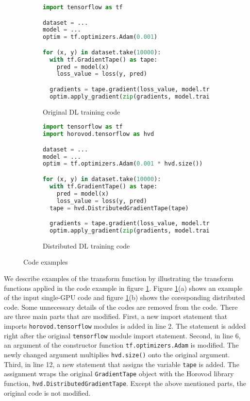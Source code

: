 \begin{figure}[ht!]
  \centering
  \begin{subfigure}[t]{0.48\textwidth}
    \begin{lstlisting}[language=Python]
import tensorflow as tf

dataset = ...
model = ...
optim = tf.optimizers.Adam(0.001) 

for (x, y) in dataset.take(10000):
  with tf.GradientTape() as tape:
    pred = model(x)
    loss_value = loss(y, pred) 

  gradients = tape.gradient(loss_value, model.trainable_variables)
  optim.apply_gradient(zip(gradients, model.trainable_variable)\end{lstlisting}
    \caption{Original DL training code}
  \end{subfigure}
  \hspace{5mm}
  \begin{subfigure}[t]{0.48\textwidth}
    \begin{lstlisting}[language=Python]
import tensorflow as tf
import horovod.tensorflow as hvd

dataset = ...
model = ...
optim = tf.optimizers.Adam(0.001 * hvd.size()) 

for (x, y) in dataset.take(10000):
  with tf.GradientTape() as tape:
    pred = model(x)
    loss_value = loss(y, pred) 
  tape = hvd.DistributedGradientTape(tape)

  gradients = tape.gradient(loss_value, model.trainable_variables)
  optim.apply_gradient(zip(gradients, model.trainable_variable)\end{lstlisting}
    \caption{Distributed DL training code}
  \end{subfigure}
  \caption{Code examples}
  \label{fig:trans:ex}
\end{figure}

We describe examples of the transform function by illustrating the transform
functions applied in the code example in figure \ref{fig:trans:ex}.
Figure \ref{fig:trans:ex}(a) shows an example of the input single-GPU code and
figure \ref{fig:trans:ex}(b) shows the coresponding distributed code. 
Some unnecessary details of the codes are removed from the code.
There are three main parts that are modified.
First, a new import statement that imports {\tt horovod.tensorflow} modules
is added in line 2. 
The statement is added right after the original {\tt tensorflow} module
import statement.
Second, in line 6, an argument of the constructor function 
{\tt tf.optimizers.Adam} is modified. The newly changed argument multiplies
{\tt hvd.size()} onto the original argument.
Third, in line 12, a new statement that assigns the variable {\tt tape}
is added. The assignment wraps the original {\tt GradientTape} object with
the Horovod library function, {\tt hvd.DistributedGradientTape}.
Except the above mentioned parts, the original code is not modified.     

